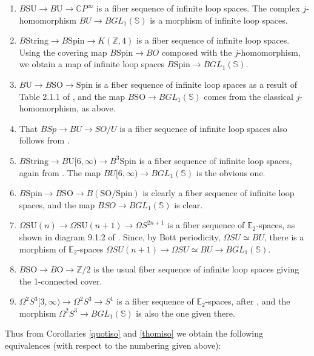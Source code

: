 \documentclass{article}
\theoremstyle{definition}
\theoremstyle{plain}
\newcommand{\ints}{\mathbb{Z}}
\newcommand{\sph}{\mathbb{S}}
\newcommand{\E}{\mathbb{E}}
\newcommand{\BString}{B\mathrm{String}}
\newcommand{\BSpin}{B\mathrm{Spin}}
\newcommand{\BO}{B\mathrm{O}}
\newcommand{\BU}{B\mathrm{U}}
\newcommand{\BSO}{B\mathrm{SO}}
\newcommand{\BSU}{B\mathrm{SU}}
\newcommand{\Spin}{\mathrm{Spin}}
\newcommand{\SO}{\mathrm{SO}}
\newcommand{\SU}{\mathrm{SU}}
\begin{document}
\begin{enumerate}
\item $\BSU\to \BU\to\mathbb{C}P^\infty$ is a fiber sequence of infinite loop spaces. The complex $j$-homomorphism $BU\to BGL_1(\sph)$ is a morphism of infinite loop spaces.
\item $\BString\to \BSpin\to K(\ints,4)$ is a fiber sequence of infinite loop spaces. Using the covering map $\BSpin\to BO$ composed with the $j$-homomorphism, we obtain a map of infinite loop spaces $\BSpin\to BGL_1(\sph)$.
\item $\BU\to \BSO\to \Spin$ is a fiber sequence of infinite loop spaces as a result of Table 2.1.1 of \cite{klw}, and the map $\BSO\to BGL_1(\sph)$ comes from the classical $j$-homomorphism, as above. 
\item That $BSp\to BU\to SO/U$ is a fiber sequence of infinite loop spaces also follows from \cite{klw}. 
\item $ \BString\to \BU[6,\infty)\to B^3\Spin$ is a fiber sequence of infinite loop spaces, again from \cite{klw}. The map $BU[6,\infty)\to BGL_1(\sph)$ is the obvious one. 
\item $\BSpin\to \BSO\to B(\SO/\Spin)$ is clearly a fiber sequence of infinite loop spaces, and the map $BSO\to BGL_1(\sph)$ is clear.
\item $\Omega \SU(n)\to \Omega \SU(n+1)\to \Omega S^{2n+1}$ is a fiber sequence of $\E_2$-spaces, as shown in diagram 9.1.2 of \cite{rav2}. Since, by Bott periodicity, $\Omega SU\simeq BU$, there is a morphism of $\E_2$-spaces $\Omega SU(n+1)\to \Omega SU\simeq BU\to BGL_1(\sph)$. 
\item $\BSO\to \BO\to \ints/2$ is the usual fiber sequence of infinite loop spaces giving the 1-connected cover. 
\item $\Omega^2 S^3[3,\infty)\to \Omega^2S^3\to S^1$ is a fiber sequence of $\E_2$-spaces, after \cite{mahringthom}, and the morphism $\Omega^2S^3\to BGL_1(\sph)$ is also the one given there.
\end{enumerate}

Thus from Corollaries \ref{quotiso} and \ref{thomiso} we obtain the following equivalences (with respect to the numbering given above):
\end{document}
